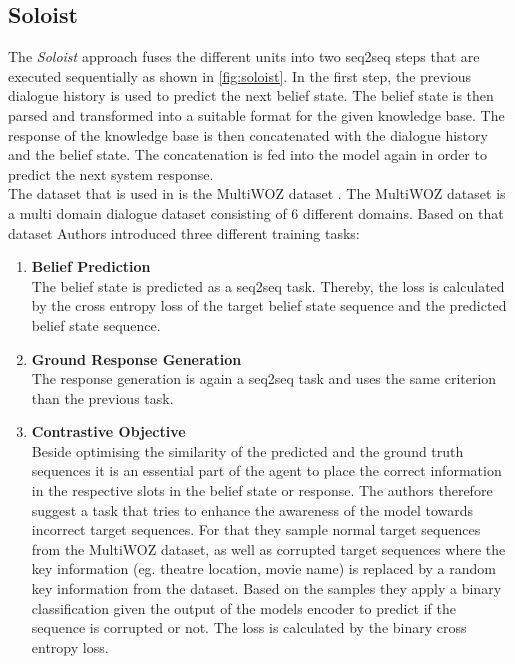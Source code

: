 \documentclass[twocolumn]{tum-article}
\begin{document}
\subsection{Soloist}\label{sec:soloist}
The \textit{Soloist} \cite{peng2020soloist} approach fuses the different units into two seq2seq steps that are executed sequentially as shown in \autoref{fig:soloist}. In the first step, the previous dialogue history is used to predict the next belief state. The belief state is then parsed and transformed into a suitable format for the given knowledge base. The response of the knowledge base is then concatenated with the dialogue history and the belief state. The concatenation is fed into the model again in order to predict the next system response.\\
The dataset that is used in \cite{peng2020soloist} is the MultiWOZ dataset \cite{budzianowski2020multiwoz}. The MultiWOZ dataset is a multi domain dialogue dataset consisting of 6 different domains. Based on that dataset Authors introduced three different training tasks:
\begin{enumerate}
\item \textbf{Belief Prediction}\\
The belief state is predicted as a seq2seq task. Thereby, the loss is calculated by the cross entropy loss of the target belief state sequence and the predicted belief state sequence.  
\item \textbf{Ground Response Generation}\\
The response generation is again a seq2seq task and uses the same criterion than the previous task.
\item \textbf{Contrastive Objective}\\
Beside optimising the similarity of the predicted and the ground truth sequences it is an essential part of the agent to place the correct information in the respective slots in the belief state or response. The authors therefore suggest a task that tries to enhance the awareness of the model towards incorrect target sequences. For that they sample normal target sequences from the MultiWOZ dataset, as well as corrupted target sequences where the key information (eg. theatre location, movie name) is replaced by a random key information from the dataset. Based on the samples they apply a binary classification given the output of the models encoder to predict if the sequence is corrupted or not. The loss is calculated by the binary cross entropy loss. 
\end{enumerate}
\end{document}
